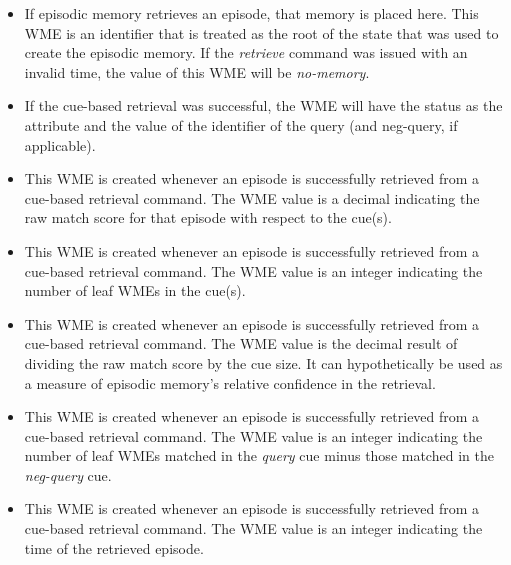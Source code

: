\begin{itemize}

\item {}

If episodic memory retrieves an episode, that memory is placed here. 
This WME is an identifier that is treated as the root of the state that was used to create the episodic memory. 
If the \emph{retrieve} command was issued with an invalid time, the value of this WME will be \emph{no-memory}.

\item {}

If the cue-based retrieval was successful, the WME will have the status as the attribute and the value of the identifier of the query (and neg-query, if applicable).

\item {}

This WME is created whenever an episode is successfully retrieved from a cue-based retrieval command. 
The WME value is a decimal indicating the raw match score for that episode with respect to the cue(s).

\item {}

This WME is created whenever an episode is successfully retrieved from a cue-based retrieval command.  
The WME value is an integer indicating the number of leaf WMEs in the cue(s).

\item {}

This WME is created whenever an episode is successfully retrieved from a cue-based retrieval command.  
The WME value is the decimal result of dividing the raw match score by the cue size.  
It can hypothetically be used as a measure of episodic memory's relative confidence in the retrieval.

\item {}

This WME is created whenever an episode is successfully retrieved from a cue-based retrieval command.  
The WME value is an integer indicating the number of leaf WMEs matched in the \emph{query} cue minus those matched in the \emph{neg-query} cue.

\item {}

This WME is created whenever an episode is successfully retrieved from a cue-based retrieval command.  
The WME value is an integer indicating the time of the retrieved episode.


\end{itemize}
